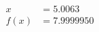 \documentclass[preview]{standalone}
\begin{document}
\begin{align*}
x &= 5.0063\\f(x) &= 7.9999950
\end{align*}
\end{document}
